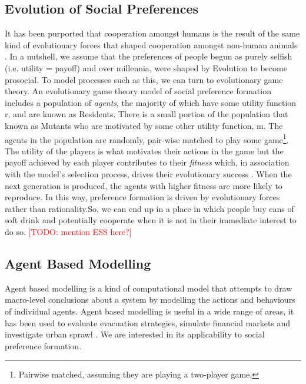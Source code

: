\documentclass[11pt]{article}
\newcommand{\todo}[1]{\textcolor{red}{[TODO: #1]}\PackageWarning{TODO:}{#1!}}
\begin{document}
\subsection{Evolution of Social Preferences}
It has been purported that cooperation amongst humans is the result of the same
kind of evolutionary forces that shaped cooperation amongst non-human animals
\cite{silk_evolution_2016}. In a nutshell, we assume that the preferences of
people begun as purely selfish (i.e. utility = payoff) and over millennia, were
shaped by Evolution to become prosocial. To model processes such as this, we
can turn to evolutionary game theory. An evolutionary game theory model of
social preference formation includes a population of \textit{agents}, the
majority of which have some utility function r, and are known as Residents.
There is a small portion of the population that known as Mutants who are
motivated by some other utility function, m. The agents in the population are
randomly, pair-wise matched to play some game\footnote{Pairwise matched,
assuming they are playing a two-player game.}. The utility of the players is
what motivates their actions in the game but the  payoff achieved by each
player contributes to their \textit{fitness} which, in association with the
model's selection process, drives their evolutionary success . When the next
generation is produced, the agents with higher fitness are more likely to
reproduce. In this way, preference formation is driven by evolutionary
forces rather than rationality.So, we can end up in a place in which people
buy cans of soft drink and potentially cooperate when it is not in their
immediate interest to do so.
\todo{mention ESS here?}
\subsection{Agent Based Modelling}
Agent based modelling is a kind of computational model that attempts to draw
macro-level conclusions about a system by modelling the actions and behaviours
of individual agents. Agent based modelling is useful in a wide range of areas,
it has been used to evaluate evacuation strategies\cite{taylor_agent-based_2014},
simulate financial markets \cite{deissenberg_eurace:_2008} and investigate
urban sprawl \cite{brown_effects_2006}. We are interested in its applicability
to social preference formation.
\end{document}

